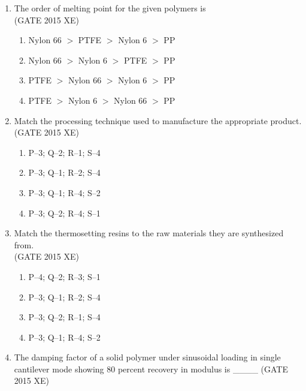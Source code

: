 \documentclass[journal,12pt,onecolumn]{IEEEtran}
\begin{document}
\begin{enumerate}
\item The order of melting point for the given polymers is\\
\hfill{(GATE 2015 XE)} 
\begin{multicols}{2}
\begin{enumerate}
\item Nylon 66 $>$ PTFE $>$ Nylon 6 $>$ PP
\item Nylon 66 $>$ Nylon 6 $>$ PTFE $>$ PP
\item PTFE $>$ Nylon 66 $>$ Nylon 6 $>$ PP
\item PTFE $>$ Nylon 6 $>$ Nylon 66 $>$ PP
\end{enumerate}
\end{multicols}

\newpage

\item Match the processing technique used to manufacture the appropriate product.\\


\hfill{(GATE 2015 XE)} 
\begin{multicols}{2}
\begin{enumerate}
\item P–3; Q–2; R–1; S–4
\item P–3; Q–1; R–2; S–4
\item P–3; Q–1; R–4; S–2
\item P–3; Q–2; R–4; S–1
\end{enumerate}
\end{multicols}

\item Match the thermosetting resins to the raw materials they are synthesized from.\\



\hfill{(GATE 2015 XE)} 
\begin{multicols}{2}

\begin{enumerate}
\item P–4; Q–2; R–3; S–1
\item P–3; Q–1; R–2; S–4
\item P–3; Q–2; R–1; S–4
\item P–3; Q–1; R–4; S–2
\end{enumerate}
\end{multicols}


\item The damping factor of a solid polymer under sinusoidal loading in single cantilever mode showing 80 percent recovery in modulus is \_\_\_\_
\hfill{(GATE 2015 XE)} \\



\end{enumerate}
\end{document}

